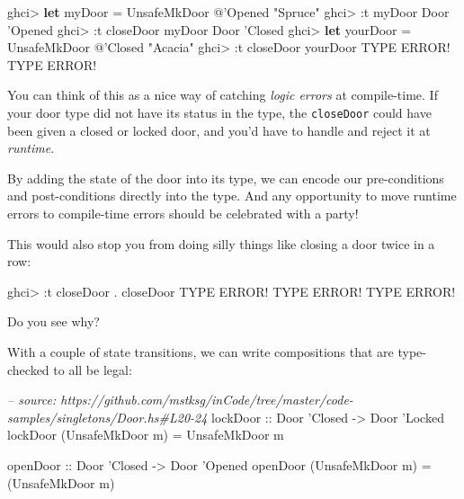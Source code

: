 \documentclass[]{article}
\newenvironment{Shaded}{}{}
\newcommand{\KeywordTok}[1]{\textcolor[rgb]{0.00,0.44,0.13}{\textbf{#1}}}
\newcommand{\DataTypeTok}[1]{\textcolor[rgb]{0.56,0.13,0.00}{#1}}
\newcommand{\CharTok}[1]{\textcolor[rgb]{0.25,0.44,0.63}{#1}}
\newcommand{\CommentTok}[1]{\textcolor[rgb]{0.38,0.63,0.69}{\textit{#1}}}
\newcommand{\OtherTok}[1]{\textcolor[rgb]{0.00,0.44,0.13}{#1}}
\newcommand{\FunctionTok}[1]{\textcolor[rgb]{0.02,0.16,0.49}{#1}}
\newcommand{\NormalTok}[1]{#1}
\begin{document}
\begin{Shaded}
\begin{Highlighting}[]
\NormalTok{ghci}\FunctionTok{>} \KeywordTok{let}\NormalTok{ myDoor }\FunctionTok{=} \DataTypeTok{UnsafeMkDoor} \FunctionTok{@}\CharTok{'Opened "Spruce"}
\NormalTok{ghci}\FunctionTok{>} \FunctionTok{:}\NormalTok{t myDoor}
\DataTypeTok{Door} \CharTok{'Opened}
\NormalTok{ghci}\FunctionTok{>} \FunctionTok{:}\NormalTok{t closeDoor myDoor}
\DataTypeTok{Door} \CharTok{'Closed}
\NormalTok{ghci}\FunctionTok{>} \KeywordTok{let}\NormalTok{ yourDoor }\FunctionTok{=} \DataTypeTok{UnsafeMkDoor} \FunctionTok{@}\CharTok{'Closed "Acacia"}
\NormalTok{ghci}\FunctionTok{>} \FunctionTok{:}\NormalTok{t closeDoor yourDoor}
\DataTypeTok{TYPE} \DataTypeTok{ERROR}\FunctionTok{!}  \DataTypeTok{TYPE} \DataTypeTok{ERROR}\FunctionTok{!}
\end{Highlighting}
\end{Shaded}

You can think of this as a nice way of catching \emph{logic errors} at
compile-time. If your door type did not have its status in the type, the
\texttt{closeDoor} could have been given a closed or locked door, and you'd have
to handle and reject it at \emph{runtime}.

By adding the state of the door into its type, we can encode our pre-conditions
and post-conditions directly into the type. And any opportunity to move runtime
errors to compile-time errors should be celebrated with a party!

This would also stop you from doing silly things like closing a door twice in a
row:

\begin{Shaded}
\begin{Highlighting}[]
\NormalTok{ghci}\FunctionTok{>} \FunctionTok{:}\NormalTok{t closeDoor }\FunctionTok{.}\NormalTok{ closeDoor}
\DataTypeTok{TYPE} \DataTypeTok{ERROR}\FunctionTok{!}  \DataTypeTok{TYPE} \DataTypeTok{ERROR}\FunctionTok{!}  \DataTypeTok{TYPE} \DataTypeTok{ERROR}\FunctionTok{!}
\end{Highlighting}
\end{Shaded}

Do you see why?

With a couple of state transitions, we can write compositions that are
type-checked to all be legal:

\begin{Shaded}
\begin{Highlighting}[]
\CommentTok{-- source: https://github.com/mstksg/inCode/tree/master/code-samples/singletons/Door.hs#L20-24}
\OtherTok{lockDoor ::} \DataTypeTok{Door} \CharTok{'Closed -> Door '}\DataTypeTok{Locked}
\NormalTok{lockDoor (}\DataTypeTok{UnsafeMkDoor}\NormalTok{ m) }\FunctionTok{=} \DataTypeTok{UnsafeMkDoor}\NormalTok{ m}

\OtherTok{openDoor ::} \DataTypeTok{Door} \CharTok{'Closed -> Door '}\DataTypeTok{Opened}
\NormalTok{openDoor (}\DataTypeTok{UnsafeMkDoor}\NormalTok{ m) }\FunctionTok{=}\NormalTok{ (}\DataTypeTok{UnsafeMkDoor}\NormalTok{ m)}
\end{Highlighting}
\end{Shaded}
\end{document}
